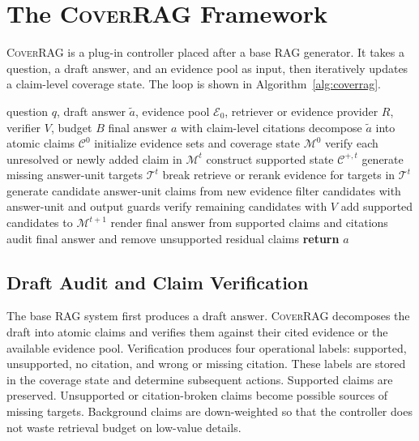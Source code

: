 \section{The \textsc{CoverRAG} Framework}
\label{sec:framework}

\textsc{CoverRAG} is a plug-in controller placed after a base RAG generator. It takes a question, a draft answer, and an evidence pool as input, then iteratively updates a claim-level coverage state. The loop is shown in Algorithm~\ref{alg:coverrag}.

\begin{algorithm}[t]
\caption{\textsc{CoverRAG}: Coverage-Guided Claim Controller}
\label{alg:coverrag}
\begin{algorithmic}[1]
\REQUIRE question $q$, draft answer $\tilde{a}$, evidence pool $\mathcal{E}_0$, retriever or evidence provider $R$, verifier $V$, budget $B$
\ENSURE final answer $a$ with claim-level citations
\STATE decompose $\tilde{a}$ into atomic claims $\mathcal{C}^{0}$
\STATE initialize evidence sets and coverage state $\mathcal{M}^{0}$
    \STATE verify each unresolved or newly added claim in $\mathcal{M}^{t}$
    \STATE construct supported state $\mathcal{C}^{+,t}$
    \STATE generate missing answer-unit targets $\mathcal{T}^{t}$
        \STATE break
    \ENDIF
    \STATE retrieve or rerank evidence for targets in $\mathcal{T}^{t}$
    \STATE generate candidate answer-unit claims from new evidence
    \STATE filter candidates with answer-unit and output guards
    \STATE verify remaining candidates with $V$
    \STATE add supported candidates to $\mathcal{M}^{t+1}$
\ENDFOR
\STATE render final answer from supported claims and citations
\STATE audit final answer and remove unsupported residual claims
\STATE \textbf{return} $a$
\end{algorithmic}
\end{algorithm}

\subsection{Draft Audit and Claim Verification}

The base RAG system first produces a draft answer. \textsc{CoverRAG} decomposes the draft into atomic claims and verifies them against their cited evidence or the available evidence pool. Verification produces four operational labels: supported, unsupported, no citation, and wrong or missing citation. These labels are stored in the coverage state and determine subsequent actions. Supported claims are preserved. Unsupported or citation-broken claims become possible sources of missing targets. Background claims are down-weighted so that the controller does not waste retrieval budget on low-value details.

